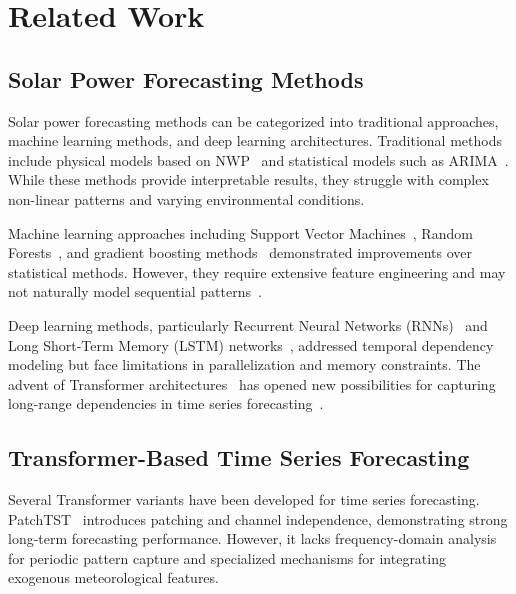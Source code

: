 \documentclass[a4paper,fleqn]{cas-dc}
\begin{document}
\section{Related Work}\label{sec:related_work}

\subsection{Solar Power Forecasting Methods}

Solar power forecasting methods can be categorized into traditional approaches, machine learning methods, and deep learning architectures. Traditional methods include physical models based on NWP~\cite{de2006improvement,rahman2015effects} and statistical models such as ARIMA~\cite{box2015time,singh2019guide,colak2015multi}. While these methods provide interpretable results, they struggle with complex non-linear patterns and varying environmental conditions.

Machine learning approaches including Support Vector Machines~\cite{cortes1995support}, Random Forests~\cite{breiman2001random}, and gradient boosting methods~\cite{chen2016xgboost,ke2017lightgbm,voyant2017machine,persson2017multi} demonstrated improvements over statistical methods. However, they require extensive feature engineering and may not naturally model sequential patterns~\cite{jebli2021prediction}.

Deep learning methods, particularly Recurrent Neural Networks (RNNs)~\cite{li2019recurrent} and Long Short-Term Memory (LSTM) networks~\cite{hochreiter1997long,lim2022solar,jebli2021deep}, addressed temporal dependency modeling but face limitations in parallelization and memory constraints. The advent of Transformer architectures~\cite{vaswani2017attention} has opened new possibilities for capturing long-range dependencies in time series forecasting~\cite{han2019review}.

\subsection{Transformer-Based Time Series Forecasting}

Several Transformer variants have been developed for time series forecasting. PatchTST~\cite{nie2022patchtst} introduces patching and channel independence, demonstrating strong long-term forecasting performance. However, it lacks frequency-domain analysis for periodic pattern capture and specialized mechanisms for integrating exogenous meteorological features.
\end{document}
